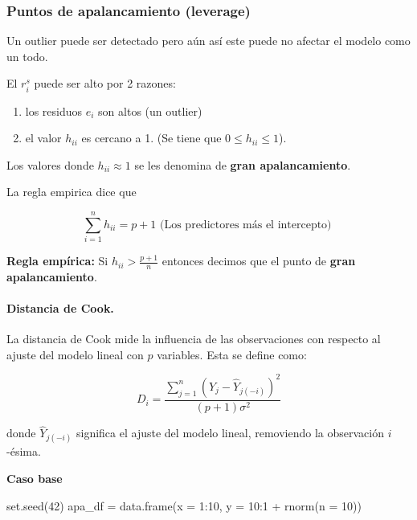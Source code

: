 \documentclass[
  12pt,
]{book}
\newenvironment{Shaded}{\begin{snugshade}}{\end{snugshade}}
\newcommand{\AttributeTok}[1]{\textcolor[rgb]{0.77,0.63,0.00}{#1}}
\newcommand{\DecValTok}[1]{\textcolor[rgb]{0.00,0.00,0.81}{#1}}
\newcommand{\FunctionTok}[1]{\textcolor[rgb]{0.00,0.00,0.00}{#1}}
\newcommand{\NormalTok}[1]{#1}
\newcommand{\OtherTok}[1]{\textcolor[rgb]{0.56,0.35,0.01}{#1}}
\newcommand{\SpecialCharTok}[1]{\textcolor[rgb]{0.00,0.00,0.00}{#1}}
\providecommand{\tightlist}{%
  \setlength{\itemsep}{0pt}\setlength{\parskip}{0pt}}
\theoremstyle{definition}
\theoremstyle{definition}
\theoremstyle{definition}
\theoremstyle{remark}
\begin{document}
\hypertarget{puntos-de-apalancamiento-leverage}{%
\subsubsection{Puntos de apalancamiento (leverage)}\label{puntos-de-apalancamiento-leverage}}

Un outlier puede ser detectado pero aún así este puede no afectar el modelo como un todo.

El \(r_{i}^s\) puede ser alto por 2 razones:

\begin{enumerate}
\def\labelenumi{\arabic{enumi}.}
\tightlist
\item
  los residuos \(e_i\) son altos (un outlier)
\item
  el valor \(h_{ii}\) es cercano a 1. (Se tiene que \(0\leq h_{ii}\leq 1\)).
\end{enumerate}

Los valores donde \(h_{ii}\approx 1\) se les denomina de \textbf{gran apalancamiento}.

La regla empirica dice que

\begin{equation*}
\sum_{i=1}^{n} h_{ii} = p +1 \text{  (Los predictores más el intercepto)   }
\end{equation*}

\textbf{Regla empírica:} Si \(h_{ii}>\frac{p+1}{n}\) entonces decimos que el punto de \textbf{gran apalancamiento}.

\hypertarget{distancia-de-cook.}{%
\paragraph{Distancia de Cook.}\label{distancia-de-cook.}}

La distancia de Cook mide la influencia de las observaciones con respecto al ajuste del modelo lineal con \(p\) variables. Esta se define como:

\[
\displaystyle D_i = \frac{\sum\limits_{j=1}^n (\hat{Y}_j - \hat{Y}_{j(-i)})^2}{(p+1) \sigma^2}
\]

donde \(\hat{Y}_{j(-i)}\) significa el ajuste del modelo lineal, removiendo la observación \(i\)-ésima.

\textbf{Caso base}

\begin{Shaded}
\begin{Highlighting}[]
\FunctionTok{set.seed}\NormalTok{(}\DecValTok{42}\NormalTok{)}
\NormalTok{apa\_df }\OtherTok{=} \FunctionTok{data.frame}\NormalTok{(}\AttributeTok{x =} \DecValTok{1}\SpecialCharTok{:}\DecValTok{10}\NormalTok{, }\AttributeTok{y =} \DecValTok{10}\SpecialCharTok{:}\DecValTok{1} \SpecialCharTok{+} \FunctionTok{rnorm}\NormalTok{(}\AttributeTok{n =} \DecValTok{10}\NormalTok{))}
\end{Highlighting}
\end{Shaded}
\end{document}
